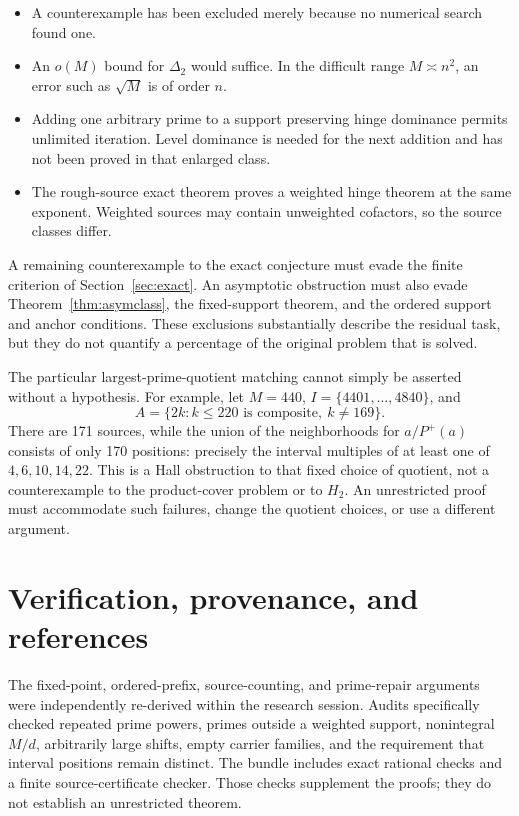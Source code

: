 \documentclass[11pt,a4paper]{article}
\theoremstyle{remark}
\begin{document}
\begin{itemize}
\item A counterexample has been excluded merely because no numerical
search found one.
\item An \(o(M)\) bound for \(\Delta_2\) would suffice. In the difficult
range \(M\asymp n^2\), an error such as \(\sqrt M\) is of order \(n\).
\item Adding one arbitrary prime to a support preserving hinge
dominance permits unlimited iteration. Level dominance is needed
for the next addition and has not been proved in that enlarged class.
\item The rough-source exact theorem proves a weighted hinge theorem
at the same exponent. Weighted sources may contain unweighted
cofactors, so the source classes differ.
\end{itemize}

A remaining counterexample to the exact conjecture must evade the
finite criterion of Section~\ref{sec:exact}. An asymptotic obstruction
must also evade Theorem~\ref{thm:asymclass}, the fixed-support theorem,
and the ordered support and anchor conditions.
These exclusions substantially describe the residual task, but they
do not quantify a percentage of the original problem that is solved.

The particular largest-prime-quotient matching cannot simply be
asserted without a hypothesis. For example, let \(M=440\),
\(I=\{4401,\ldots,4840\}\), and
\[
 A=\{2k: k\le220\text{ is composite},\ k\ne169\}.
 \]
There are 171 sources, while the union of the neighborhoods for
\(a/P^+(a)\) consists of only 170 positions: precisely the interval
multiples of at least one of \(4,6,10,14,22\).
This is a Hall obstruction to that fixed choice of quotient, not a
counterexample to the product-cover problem or to \(H_2\).
An unrestricted proof must accommodate such failures, change the
quotient choices, or use a different argument.

\section{Verification, provenance, and references}
\label{sec:refs}

The fixed-point, ordered-prefix, source-counting, and prime-repair
arguments were independently re-derived within the research session.
Audits specifically checked repeated prime powers, primes outside a
weighted support, nonintegral \(M/d\), arbitrarily large shifts,
empty carrier families, and the requirement that interval positions
remain distinct. The bundle includes exact rational checks and a
finite source-certificate checker. Those checks supplement the
proofs; they do not establish an unrestricted theorem.
\end{document}
